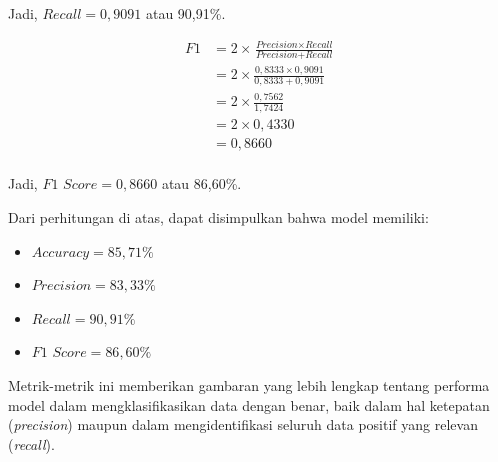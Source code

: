 Jadi, \(\textit{Recall} = 0{,}9091\) atau 90,91\%.


\begin{align*}
    \textit{F1} &= 2 \times \frac{\textit{Precision} \times \textit{Recall}}{\textit{Precision} + \textit{Recall}} \\
    &= 2 \times \frac{0{,}8333 \times 0{,}9091}{0{,}8333 + 0{,}9091} \\
    &= 2 \times \frac{0{,}7562}{1{,}7424} \\
    &= 2 \times 0{,}4330 \\
    &= 0{,}8660\\
\end{align*}

Jadi, \(\textit{F1 Score} = 0{,}8660\) atau 86,60\%.

\medskip
Dari perhitungan di atas, dapat disimpulkan bahwa model memiliki:
\begin{itemize}
    \item \(\textit{Accuracy} = 85,71\%\)
    \item \(\textit{Precision} = 83,33\%\)
    \item \(\textit{Recall} = 90,91\%\)
    \item \(\textit{F1 Score} = 86,60\%\)
\end{itemize}
Metrik-metrik ini memberikan gambaran yang lebih lengkap tentang performa model dalam mengklasifikasikan data dengan benar, baik dalam hal ketepatan (\textit{precision}) maupun dalam mengidentifikasi seluruh data positif yang relevan (\textit{recall}).
\clearpage

